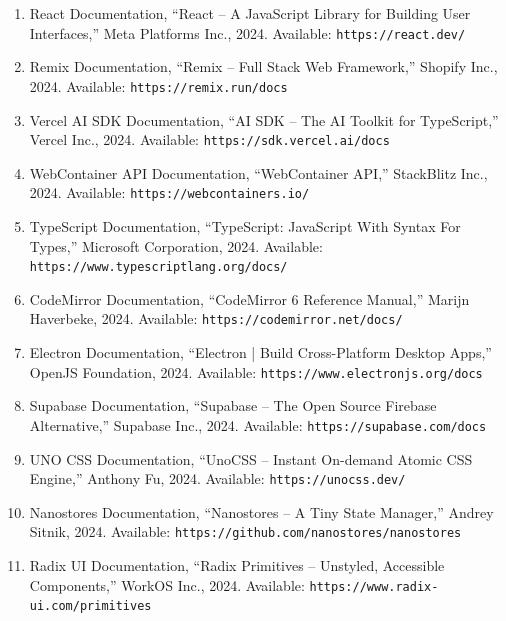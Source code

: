 \documentclass[12pt,a4paper,openany]{report}
\begin{document}
\begin{enumerate}
    \item React Documentation, ``React -- A JavaScript Library for Building User Interfaces,'' Meta Platforms Inc., 2024. Available: \texttt{https://react.dev/}

    \item Remix Documentation, ``Remix -- Full Stack Web Framework,'' Shopify Inc., 2024. Available: \texttt{https://remix.run/docs}

    \item Vercel AI SDK Documentation, ``AI SDK -- The AI Toolkit for TypeScript,'' Vercel Inc., 2024. Available: \texttt{https://sdk.vercel.ai/docs}

    \item WebContainer API Documentation, ``WebContainer API,'' StackBlitz Inc., 2024. Available: \texttt{https://webcontainers.io/}

    \item TypeScript Documentation, ``TypeScript: JavaScript With Syntax For Types,'' Microsoft Corporation, 2024. Available: \texttt{https://www.typescriptlang.org/docs/}

    \item CodeMirror Documentation, ``CodeMirror 6 Reference Manual,'' Marijn Haverbeke, 2024. Available: \texttt{https://codemirror.net/docs/}

    \item Electron Documentation, ``Electron | Build Cross-Platform Desktop Apps,'' OpenJS Foundation, 2024. Available: \texttt{https://www.electronjs.org/docs}

    \item Supabase Documentation, ``Supabase -- The Open Source Firebase Alternative,'' Supabase Inc., 2024. Available: \texttt{https://supabase.com/docs}

    \item UNO CSS Documentation, ``UnoCSS -- Instant On-demand Atomic CSS Engine,'' Anthony Fu, 2024. Available: \texttt{https://unocss.dev/}

    \item Nanostores Documentation, ``Nanostores -- A Tiny State Manager,'' Andrey Sitnik, 2024. Available: \texttt{https://github.com/nanostores/nanostores}

    \item Radix UI Documentation, ``Radix Primitives -- Unstyled, Accessible Components,'' WorkOS Inc., 2024. Available: \texttt{https://www.radix-ui.com/primitives}


\end{enumerate}
\end{document}
